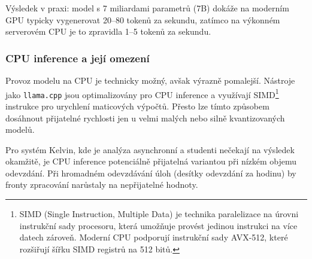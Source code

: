 Výsledek v praxi: model s 7 miliardami parametrů (7B) dokáže na moderním GPU typicky vygenerovat 20--80 tokenů za sekundu, zatímco na výkonném serverovém CPU je to zpravidla 1--5 tokenů za sekundu.

\subsubsection*{CPU inference a její omezení}

Provoz modelu na CPU je technicky možný, avšak výrazně pomalejší.
Nástroje jako \texttt{llama.cpp} \cite{llamacpp} jsou optimalizovány pro CPU inference a využívají SIMD\footnote{SIMD (Single Instruction, Multiple Data) je technika paralelizace na úrovni instrukční sady procesoru, která umožňuje provést jedinou instrukci na více datech zároveň. Moderní CPU podporují instrukční sady AVX-512, které rozšiřují šířku SIMD registrů na 512 bitů.}
instrukce pro urychlení maticových výpočtů.
Přesto lze tímto způsobem dosáhnout přijatelné rychlosti jen u velmi malých nebo silně kvantizovaných modelů.

Pro systém Kelvin, kde je analýza asynchronní a studenti nečekají na výsledek okamžitě, je CPU inference potenciálně přijatelná variantou při nízkém objemu odevzdání.
Při hromadném odevzdávání úloh (desítky odevzdání za hodinu) by fronty zpracování narůstaly na nepřijatelné hodnoty.

\begin{table}[H]
    \centering
    \caption{Orientační srovnání GPU a CPU inference pro model třídy 7B parametrů s kvantizací Q4}
    \label{tab:gpu-vs-cpu}
\end{table}

